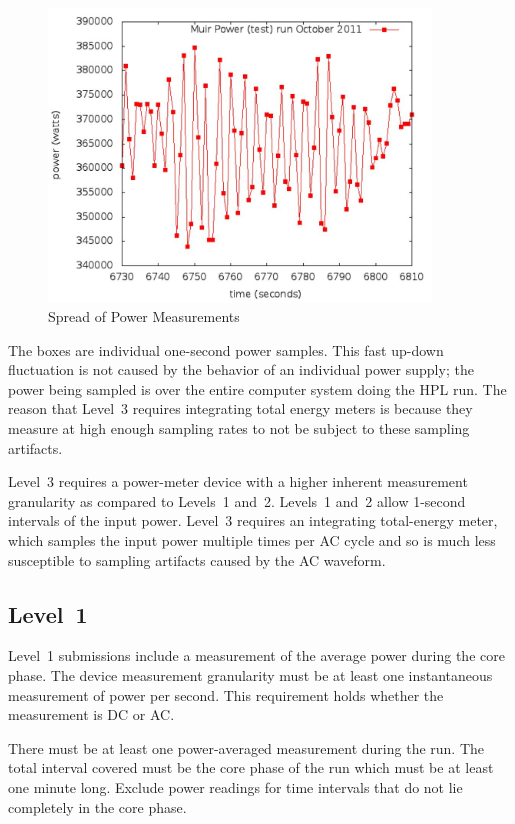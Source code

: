 \begin{figure}
\centering
\includegraphics[width=4in]{fig3-2}
\caption{Spread of Power Measurements}
\label{fig:sopm}
\end{figure}

The boxes are individual one-second power samples.
This fast up-down fluctuation is not caused by the behavior of an individual power supply; the power being sampled is over the entire computer system doing the HPL run.
The reason that Level~3 requires integrating total energy meters is because they measure at high enough sampling rates to not be subject to these sampling artifacts.

Level~3 requires a power-meter device with a higher inherent measurement granularity as compared to Levels~1 and~2.
Levels~1 and~2 allow 1-second intervals of the input power.
Level~3 requires an integrating total-energy meter, which samples the input power multiple times per AC cycle and so is much less susceptible to sampling artifacts caused by the AC waveform.

\subsection{Level~1}

Level~1 submissions include a measurement of the average power during the core phase.
The device measurement granularity must be at least one instantaneous measurement of power per second.
This requirement holds whether the measurement is DC or AC.

There must be at least one power-averaged measurement during the run.
The total interval covered must be the core phase of the run which must be at least one minute long.
Exclude power readings for time intervals that do not lie completely in the core phase.

